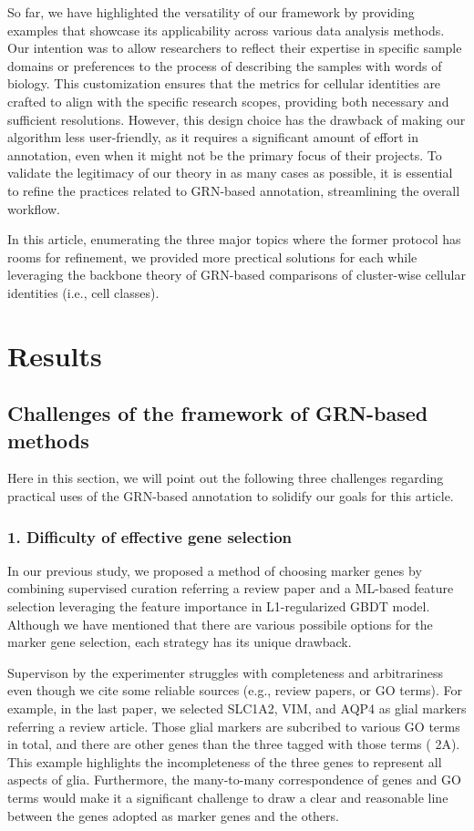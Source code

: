 \documentclass{article}
\begin{document}
So far, we have highlighted the versatility of our framework by providing examples that showcase its applicability 
across various data analysis methods. Our intention was to allow researchers to reflect their expertise in specific 
sample domains or preferences to the process of describing the samples with words of biology. This customization 
ensures that the metrics for cellular identities are crafted to align with the specific research scopes, providing both 
necessary and sufficient resolutions. However, this design choice has the drawback of making our algorithm less 
user-friendly, as it requires a significant amount of effort in annotation, even when it might not be the primary 
focus of their projects. To validate the legitimacy of our theory in as many cases as possible, it is essential to refine 
the practices related to GRN-based annotation, streamlining the overall workflow.

In this article, enumerating the three major topics where the former protocol has rooms for refinement, we 
provided more prectical solutions for each while leveraging the backbone theory of GRN-based comparisons of cluster-wise
cellular identities (i.e., cell classes).

\section*{Results}
\subsection*{Challenges of the framework of GRN-based methods}
Here in this section, we will point out the following three challenges regarding practical uses of the GRN-based 
annotation to solidify our goals for this article.

\subsubsection*{1. Difficulty of effective gene selection}
In our previous study, we proposed a method of choosing marker genes by combining supervised curation referring a review paper and a ML-based 
feature selection leveraging the feature importance in L1-regularized GBDT model. 
Although we have mentioned that there are various possibile options for the marker gene selection, each strategy has its unique drawback.

Supervison by the experimenter struggles with completeness and arbitrariness even though we cite some reliable 
sources (e.g., review papers, or GO terms). For example, in the last paper, we selected SLC1A2, VIM, and AQP4 
as glial markers referring a review article\cite{zhang2015molecular}. Those glial markers are subcribed to various GO terms in total, and there 
are other genes than the three tagged with those terms (\figurename{ 2A}). This example highlights the incompleteness of 
the three genes to represent all aspects of glia. Furthermore, the many-to-many correspondence of genes and GO 
terms would make it a significant challenge to draw a clear and reasonable line between the genes adopted as 
marker genes and the others.
\end{document}
